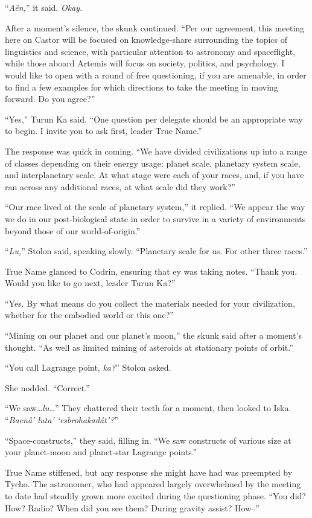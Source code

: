 ``\emph{Aën,}'' it said. \emph{Okay.}

After a moment's silence, the skunk continued. ``Per our agreement, this meeting here on Castor will be focused on knowledge-share surrounding the topics of linguistics and science, with particular attention to astronomy and spaceflight, while those aboard Artemis will focus on society, politics, and psychology. I would like to open with a round of free questioning, if you are amenable, in order to find a few examples for which directions to take the meeting in moving forward. Do you agree?''

``Yes,'' Turun Ka said. ``One question per delegate should be an appropriate way to begin. I invite you to ask first, leader True Name.''

The response was quick in coming. ``We have divided civilizations up into a range of classes depending on their energy usage: planet scale, planetary system scale, and interplanetary scale. At what stage were each of your races, and, if you have ran across any additional races, at what scale did they work?''

``Our race lived at the scale of planetary system,'' it replied. ``We appear the way we do in our post-biological state in order to survive in a variety of environments beyond those of our world-of-origin.''

``\emph{Lu,}'' Stolon said, speaking slowly. ``Planetary scale for us. For other three races.''

True Name glanced to Codrin, ensuring that ey was taking notes. ``Thank you. Would you like to go next, leader Turun Ka?''

``Yes. By what means do you collect the materials needed for your civilization, whether for the embodied world or this one?''

``Mining on our planet and our planet's moon,'' the skunk said after a moment's thought. ``As well as limited mining of asteroids at stationary points of orbit.''

``You call Lagrange point, \emph{ka?}'' Stolon asked.

She nodded. ``Correct.''

``We saw\ldots{}\emph{lu\ldots{}}'' They chattered their teeth for a moment, then looked to Iska. ``\emph{Baenå' luta' `esbrohakadåt'?}''

``Space-constructs,'' they said, filling in. ``We saw constructs of various size at your planet-moon and planet-star Lagrange points.''

True Name stiffened, but any response she might have had was preempted by Tycho. The astronomer, who had appeared largely overwhelmed by the meeting to date had steadily grown more excited during the questioning phase. ``You did? How? Radio? When did you see them? During gravity assist? How--''

